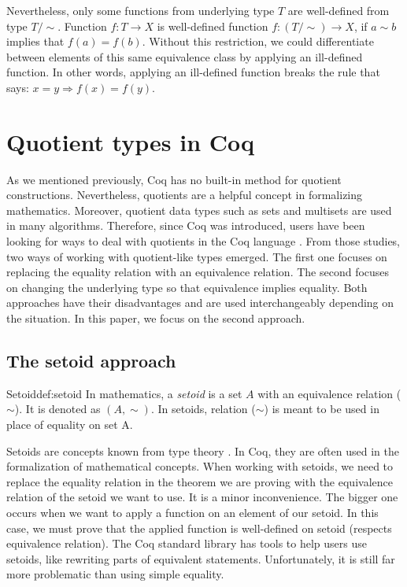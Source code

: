Nevertheless, only some functions from underlying type $T$ are well-defined from type $T/\sim$. Function $f : T \rightarrow X$ is well-defined function $f : (T/\sim) \rightarrow X$, if $a \sim b$ implies that $f(a) = f(b)$. Without this restriction, we could differentiate between elements of this same equivalence class by applying an ill-defined function. In other words, applying an ill-defined function breaks the rule that says: $x = y \Rightarrow f(x) = f(y)$.

\section{Quotient types in Coq}
As we mentioned previously, Coq has no built-in method for quotient constructions. Nevertheless, quotients are a helpful concept in formalizing mathematics. Moreover, quotient data types such as sets and multisets are used in many algorithms. Therefore, since Coq was introduced, users have been looking for ways to deal with quotients in the Coq language \cite{cicQuotient} \cite{PragmaticQT} \cite{NormalizedTypes}. From those studies, two ways of working with quotient-like types emerged. The first one focuses on replacing the equality relation with an equivalence relation. The second focuses on changing the underlying type so that equivalence implies equality. Both approaches have their disadvantages and are used interchangeably depending on the situation. In this paper, we focus on the second approach.

\subsection{The setoid approach}
\begin{defi}{Setoid}{def:setoid}
In mathematics, a \emph{setoid} is a set $A$ with an equivalence relation ($\sim$). It is denoted as $(A, \sim)$. In setoids, relation ($\sim$) is meant to be used in place of equality on set A.
\end{defi}
Setoids are concepts known from type theory \cite{SetoidsInTT} \cite{Setoids2}. In Coq, they are often used in the formalization of mathematical concepts. When working with setoids, we need to replace the equality relation in the theorem we are proving with the equivalence relation of the setoid we want to use. It is a minor inconvenience. The bigger one occurs when we want to apply a function on an element of our setoid. In this case, we must prove that the applied function is well-defined on setoid (respects equivalence relation). The Coq standard library has tools to help users use setoids, like rewriting parts of equivalent statements. Unfortunately, it is still far more problematic than using simple equality.

